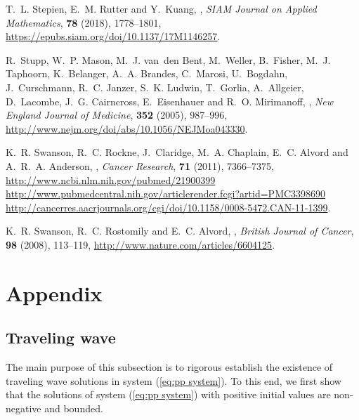 \documentclass{aims}
\numberwithin{equation}{section}
\begin{document}
\begin{thebibliography}{10}
\newblock T.~L. Stepien, E.~M. Rutter and Y.~Kuang,
,
\newblock \emph{SIAM Journal on Applied Mathematics}, \textbf{78} (2018),
  1778--1801,
\newblock \urlprefix\url{https://epubs.siam.org/doi/10.1137/17M1146257}.

\newblock R.~Stupp, W.~P. Mason, M.~J. van~den Bent, M.~Weller, B.~Fisher,
  M.~J. Taphoorn, K.~Belanger, A.~A. Brandes, C.~Marosi, U.~Bogdahn,
  J.~Curschmann, R.~C. Janzer, S.~K. Ludwin, T.~Gorlia, A.~Allgeier,
  D.~Lacombe, J.~G. Cairncross, E.~Eisenhauer and R.~O. Mirimanoff,
,
\newblock \emph{New England Journal of Medicine}, \textbf{352} (2005),
  987--996,
\newblock \urlprefix\url{http://www.nejm.org/doi/abs/10.1056/NEJMoa043330}.

\newblock K.~R. Swanson, R.~C. Rockne, J.~Claridge, M.~A. Chaplain, E.~C.
  Alvord and A.~R.~A. Anderson,
,
\newblock \emph{Cancer Research}, \textbf{71} (2011), 7366--7375,
\newblock \urlprefix\url{http://www.ncbi.nlm.nih.gov/pubmed/21900399
  http://www.pubmedcentral.nih.gov/articlerender.fcgi?artid=PMC3398690
  http://cancerres.aacrjournals.org/cgi/doi/10.1158/0008-5472.CAN-11-1399}.

\newblock K.~R. Swanson, R.~C. Rostomily and E.~C. Alvord,
,
\newblock \emph{British Journal of Cancer}, \textbf{98} (2008), 113--119,
\newblock \urlprefix\url{http://www.nature.com/articles/6604125}.

\end{thebibliography}



\section*{Appendix}
\subsection*{Traveling wave}
The main purpose of this subsection is to rigorous establish the existence of  traveling wave solutions in system (\ref{eq:pp system}). To this end, we first show that the solutions of system (\ref{eq:pp system}) 
with positive initial values are non-negative and bounded. \\
 
\end{document}
